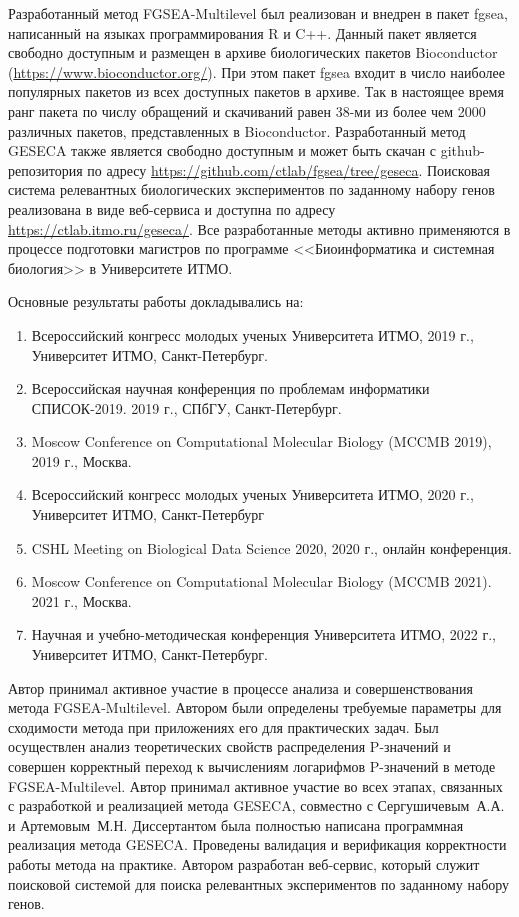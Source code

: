 {\integration} Разработанный метод FGSEA-Multilevel был реализован и внедрен в пакет fgsea, написанный на языках программирования R и C++. 
Данный пакет является свободно доступным и размещен в архиве биологических пакетов Bioconductor (\url{https://www.bioconductor.org/}).
При этом пакет fgsea входит в число наиболее популярных пакетов из всех доступных пакетов в архиве.
Так в настоящее время ранг пакета по числу обращений и скачиваний равен 38-ми из более чем 2000 различных пакетов, представленных в Bioconductor.
Разработанный метод GESECA также является свободно доступным и может быть скачан с github-репозитория по адресу \url{https://github.com/ctlab/fgsea/tree/geseca}. Поисковая система релевантных биологических экспериментов по заданному набору генов реализована в виде веб-сервиса и доступна по адресу \url{https://ctlab.itmo.ru/geseca/}. Все разработанные методы активно применяются в процессе подготовки магистров по программе <<Биоинформатика и системная биология>> в Университете ИТМО.


{\probation}
Основные результаты работы докладывались на:
\begin{enumerate}
    \item Всероссийский конгресс молодых ученых Университета ИТМО, 2019 г., Университет ИТМО, Санкт-Петербург.
    \item Всероссийская научная конференция по проблемам информатики СПИСОК-2019. 2019 г., СПбГУ, Санкт-Петербург.
    \item Moscow Conference on Computational Molecular Biology (MCCMB 2019), 2019 г., Москва.
    \item Всероссийский конгресс молодых ученых Университета ИТМО, 2020 г., Университет ИТМО, Санкт-Петербург
    \item CSHL Meeting on Biological Data Science 2020,  2020 г., онлайн конференция.
    \item Moscow Conference on Computational Molecular Biology (MCCMB 2021). 2021 г., Москва.
    \item Научная и учебно-методическая конференция Университета ИТМО, 2022 г., Университет ИТМО, Санкт-Петербург.
\end{enumerate}

{\contribution} Автор принимал активное участие в процессе анализа и совершенствования метода FGSEA-Multilevel. 
Автором были определены требуемые параметры для сходимости метода при приложениях его для практических задач. 
Был осуществлен анализ теоретических свойств распределения P-значений и совершен корректный переход к вычислениям логарифмов P-значений в методе FGSEA-Multilevel.
Автор принимал активное участие во всех этапах, связанных с разработкой и реализацией метода GESECA, совместно с Сергушичевым~А.А. и Артемовым~М.Н.
Диссертантом была полностью написана программная реализация метода GESECA.
Проведены валидация и верификация корректности работы метода на практике.
Автором разработан веб-сервис, который служит поисковой системой для поиска релевантных экспериментов по заданному набору генов.

